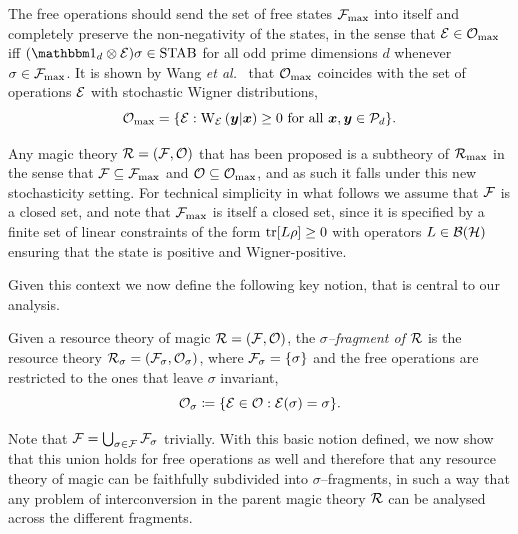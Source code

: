 \documentclass[pra,
aps,
twocolumn,
superscriptaddress,
groupedaddress,
nofootinbib,
reprint
]{revtex4-1}
\begin{document}
The free operations should send the set of free states $\Fmax$ into itself and completely preserve the non-negativity of the states, in the sense that $\E \in \Omax$ iff $(\id_d \otimes \E ) \sigma \in \stab$ for all odd prime dimensions $d$ whenever $\sigma \in \Fmax$.
It is shown by Wang \textit{et al.}~\cite{cit:wang} that $\Omax$ coincides with the set of operations $\E$ with stochastic Wigner distributions, 
\begin{equation}
    \Omax = \{ \E: \W[\bmy|\bmx]{\E} \geq 0 \text{ for all } \bmx, \bmy \in \cal{P}_d\}.
\end{equation}

Any magic theory $\R = (\F, \O)$ that has been proposed is a subtheory of $\Rmax$ in the sense that $\F \subseteq \Fmax$ and $\O \subseteq \Omax$, and as such it falls under this new stochasticity setting. 
For technical simplicity in what follows we assume that $\F$ is a closed set, and note that $\F_{\rm{ max}}$ is itself a closed set, since it is specified by a finite set of linear constraints of the form $\tr[ L\rho] \geq 0$ with operators $L \in \cal{B}(\cal{H})$ ensuring that the state is positive and Wigner-positive.


Given this context we now define the following key notion, that is central to our analysis.
\begin{definition}\label{def:sigmafrag}
   Given a resource theory of magic $\R = (\F, \O)$, the \emph{$\sigma$--fragment of $\R$} is the resource theory $\R_\sigma = (\F_\sigma, \O_\sigma)$, where $\F_\sigma = \{\sigma\}$ and the free operations are restricted to the ones that leave $\sigma$ invariant,
    \begin{equation}
        \O_\sigma \coloneqq \{ \E \in \O: \E(\sigma) = \sigma \}.
    \end{equation}
\end{definition}

Note that $\F = \bigcup_{\sigma \in \F} \F_\sigma$ trivially.
With this basic notion defined, we now show that this union holds for free operations as well and therefore that any resource theory of magic can be faithfully subdivided into $\sigma$--fragments, in such a way that any problem of interconversion in the parent magic theory $\R$ can be analysed across the different fragments.
\end{document}

